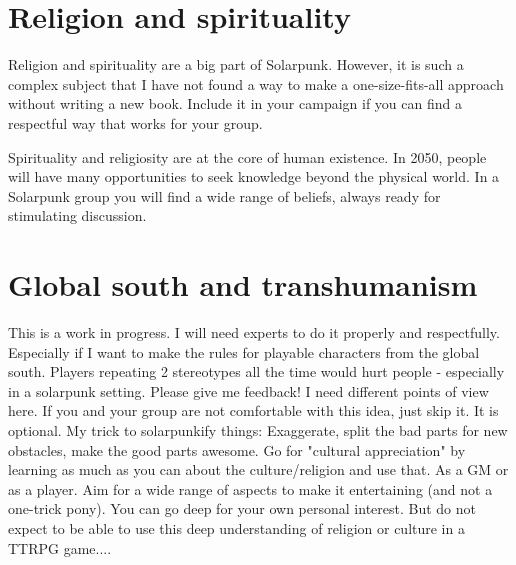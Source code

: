 \section{Religion and spirituality}

\begin{warning}
    Religion and spirituality are a big part of Solarpunk. However, it is such a complex subject that I have not found a way to make a one-size-fits-all approach without writing a new book. Include it in your campaign if you can find a respectful way that works for your group.
\end{warning}

Spirituality and religiosity are at the core of human existence. In 2050, people will have many opportunities to seek knowledge beyond the physical world. In a Solarpunk group you will find a wide range of beliefs, always ready for stimulating discussion.







\section{Global south and transhumanism}
\label{sec:Transhumanism}
\label{sec:Global South}

\begin{warning}
    This is a work in progress. I will need experts to do it properly and respectfully. Especially if I want to make the rules for playable characters from the global south. Players repeating 2 stereotypes all the time would hurt people - especially in a solarpunk setting.
    Please give me feedback! I need different points of view here.
    If you and your group are not comfortable with this idea, just skip it. It is optional.
    My trick to solarpunkify things: Exaggerate, split the bad parts for new obstacles, make the good parts awesome. Go for "cultural appreciation" by learning as much as you can about the culture/religion and use that. As a GM or as a player. Aim for a wide range of aspects to make it entertaining (and not a one-trick pony). You can go deep for your own personal interest. But do not expect to be able to use this deep understanding of religion or culture in a TTRPG game....
\end{warning}

